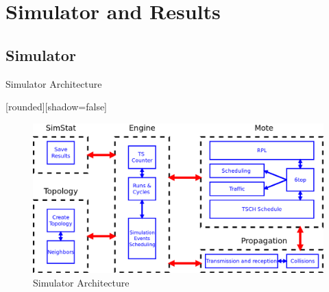 \section{Simulator and Results}
\subsection{Simulator}
\begin{withoutheadline}
\begin{frame}{Simulator Architecture}


[rounded][shadow=false]

\begin{figure}[p]

\includegraphics[width=0.95\linewidth]{figures/SIM.png}
\caption{Simulator Architecture}
\end{figure}



\end{frame}
\end{withoutheadline}
